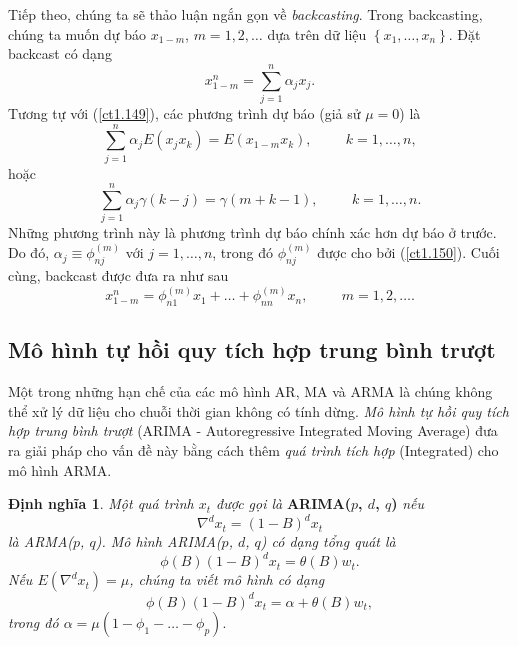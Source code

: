 \documentclass[12pt, a4paper,oneside]{book}
\theoremstyle{definition}
\newtheorem{dn}[theo]{Định nghĩa}
\begin{document}
Tiếp theo, chúng ta sẽ thảo luận ngắn gọn về \textit{backcasting}. Trong backcasting, chúng ta muốn dự báo $ x_{1-m} $, $ m=1, 2, \dots$ dựa trên dữ liệu $ \left\lbrace x_{1}, \dots, x_{n} \right\rbrace$. Đặt backcast có dạng
\begin{equation}
x_{1-m}^n=\sum_{j=1}^{n}\alpha_{j}x_{j}. \label{ct1.172}
\end{equation}
Tương tự với (\ref{ct1.149}), các phương trình dự báo (giả sử $ \mu = 0 $) là 
\begin{equation}
\sum_{j=1}^{n}\alpha_{j}E(x_{j}x_{k})=E(x_{1-m}x_{k}), \hspace{1cm} k=1, \dots, n, \label{ct1.173}
\end{equation}
hoặc 
\begin{equation}
\sum_{j=1}^{n}\alpha_{j}\gamma(k-j)=\gamma(m+k-1), \hspace{1cm} k=1, \dots, n. \label{ct1.174}
\end{equation}
Những phương trình này là phương trình dự báo chính xác hơn dự báo ở trước. Do đó, $ \alpha_{j}\equiv \phi_{nj}^{(m)} $ với $ j=1, \dots, n$, trong đó $ \phi_{nj}^{(m)} $ được cho bởi (\ref{ct1.150}). Cuối cùng, backcast được đưa ra như sau
\begin{equation}
x_{1-m}^n= \phi_{n1}^{(m)}x_{1}+ \dots+ \phi_{nn}^{(m)}x_{n}, \hspace{1cm} m=1, 2, \dots. \label{ct1.175}
\end{equation}

\subsection{\label{arima}Mô hình tự hồi quy tích hợp trung bình trượt}
Một trong những hạn chế của các mô hình AR, MA và ARMA là chúng không thể xử lý dữ liệu cho chuỗi thời gian không có tính dừng. \textit{Mô hình tự hồi quy tích hợp trung bình trượt} (ARIMA - Autoregressive Integrated Moving Average) đưa ra giải pháp cho vấn đề này bằng cách thêm \textit{quá trình tích hợp} (Integrated) cho mô hình ARMA.
\begin{dn}\cite{1, 2, 3}
	\textit{Một quá trình $ x_{t} $ được gọi là} \textbf{ARIMA($p$, $d$, $q$)} \textit{nếu 
		$$\nabla^{d} x_{t}=(1-B)^{d}x_{t}$$
		là ARMA($p$, $q$). Mô hình ARIMA($p$, $d$, $q$) có dạng tổng quát là
		\begin{equation}
		\phi(B)(1-B)^{d}x_{t}=\theta(B)w_{t}. \label{ct1.185}
		\end{equation} 
		Nếu $E(\nabla^{d} x_{t})=\mu$, chúng ta viết mô hình có dạng
		$$\phi(B)(1-B)^{d}x_{t}=\alpha+\theta(B)w_{t},$$
		trong đó $ \alpha=\mu(1-\phi_{1}-\dots-\phi_{p}).$}
\end{dn}
\end{document}
